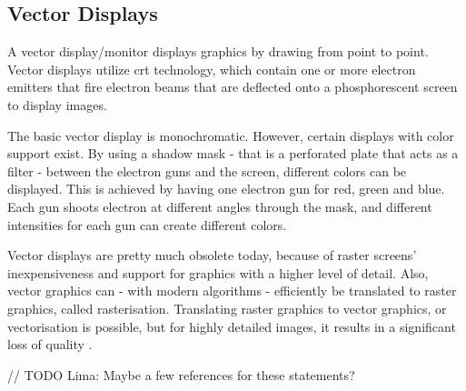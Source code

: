 \subsection{Vector Displays}
A vector display/monitor displays graphics by drawing from point to point.
Vector displays utilize \gls{crt} technology, which contain one or more electron emitters that fire electron beams that are deflected onto a phosphorescent screen to display images.

The basic vector display is monochromatic.
However, certain displays with color support exist.
By using a shadow mask - that is a perforated plate that acts as a filter - between the electron guns and the screen, different colors can be displayed. This is achieved by having one electron gun for red, green and blue. Each gun shoots electron at different angles through the mask, and different intensities for each gun can create different colors.

Vector displays are pretty much obsolete today, because of raster screens' inexpensiveness and support for graphics with a higher level of detail.
Also, vector graphics can - with modern algorithms - efficiently be translated to raster graphics, called rasterisation.
Translating raster graphics to vector graphics, or vectorisation is possible, but for highly detailed images, it results in a significant loss of quality \cite{vectorisation}.

// TODO Lima: Maybe a few references for these statements?
